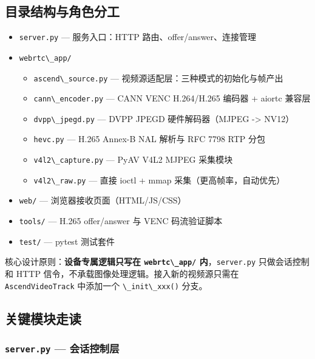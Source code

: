 \subsection{目录结构与角色分工}\label{src-book-chapter6-h147}

\begin{itemize}
\tightlist
\item
  \passthrough{\lstinline!server.py!} --- 服务入口：HTTP
  路由、offer/answer、连接管理
\item
  \passthrough{\lstinline!webrtc\_app/!}

  \begin{itemize}
  \tightlist
  \item
    \passthrough{\lstinline!ascend\_source.py!} ---
    视频源适配层：三种模式的初始化与帧产出
  \item
    \passthrough{\lstinline!cann\_encoder.py!} --- CANN VENC H.264/H.265
    编码器 + aiortc 兼容层
  \item
    \passthrough{\lstinline!dvpp\_jpegd.py!} --- DVPP JPEGD
    硬件解码器（MJPEG -\textgreater{} NV12）
  \item
    \passthrough{\lstinline!hevc.py!} --- H.265 Annex-B NAL 解析与 RFC
    7798 RTP 分包
  \item
    \passthrough{\lstinline!v4l2\_capture.py!} --- PyAV V4L2 MJPEG
    采集模块
  \item
    \passthrough{\lstinline!v4l2\_raw.py!} --- 直接 ioctl + mmap
    采集（更高帧率，自动优先）
  \end{itemize}
\item
  \passthrough{\lstinline!web/!} --- 浏览器接收页面（HTML/JS/CSS）
\item
  \passthrough{\lstinline!tools/!} --- H.265 offer/answer 与 VENC
  码流验证脚本
\item
  \passthrough{\lstinline!test/!} --- pytest 测试套件
\end{itemize}

核心设计原则：\textbf{设备专属逻辑只写在
\passthrough{\lstinline!webrtc\_app/!}
内}，\passthrough{\lstinline!server.py!} 只做会话控制和 HTTP
信令，不承载图像处理逻辑。接入新的视频源只需在
\passthrough{\lstinline!AscendVideoTrack!} 中添加一个
\passthrough{\lstinline!\_init\_xxx()!} 分支。

\subsection{关键模块走读}\label{src-book-chapter6-h148}

\subsubsection{\texorpdfstring{\texttt{server.py} ---
会话控制层}{server.py --- 会话控制层}}\label{src-book-chapter6-h149}

